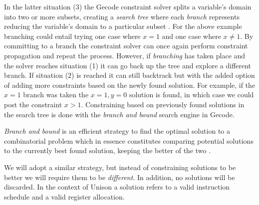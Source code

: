 In the latter situation (3) the Gecode constraint solver splits a variable's domain into
two or more subsets, creating a \textit{search tree} where each \textit{branch} represents
reducing the variable's domain to a particular subset \cite[Section~8]{MPG}. For the above
example branching could entail trying one case where $x=1$ and one case where $x\neq1$.
By committing to a branch the constraint solver can once again perform constraint
propagation and repeat the process. However, if \textit{branching} has taken place and the
solver reaches situation (1) it can go back up the tree and explore a different branch.
If situation (2) is reached it can still backtrack but with the added option of adding
more constraints based on the newly found solution. For example, if the $x=1$ branch was
taken the $x=1,y=0$ solution is found, in which case we could post the constraint $x>1$.
Constraining based on previously found solutions in the search tree is done with the
\textit{branch and bound} search engine \cite[Section~9]{MPG} in Gecode.

\textit{Branch and bound} is an efficient strategy to find the optimal solution to a
combinatorial problem which in essence constitutes comparing potential solutions to the
currently best found solution, keeping the better of the two \cite{BaB}.

We will adopt a similar strategy, but instead of constraining solutions to be better we
will require them to be \textit{different}. In addition, no solutions will be discarded.
In the context of Unison a solution refers to a valid instruction schedule and a valid
register allocation.
